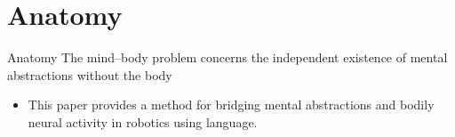 \section{Anatomy}
    \begin{frame}[allowframebreaks]{Anatomy}
        The mind--body problem concerns the independent existence of mental abstractions without the body \cite{georgiev-2020-quantum-information-theoretic-approach-to-the-mind-brain-problem}
        
        \begin{itemize}
            \item This paper provides a method for bridging mental abstractions and bodily neural activity in robotics using language.
        \end{itemize}
        
        
        
    
    \end{frame}
    
    \subsection{}
        
        